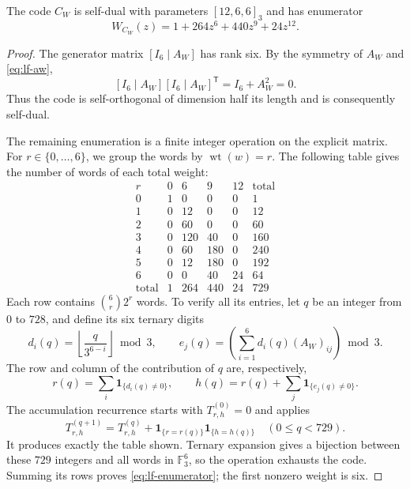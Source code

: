\begin{theorem}
\label{thm:lf-code}
The code \(C_W\) is self-dual with parameters \([12,6,6]_3\) and
has enumerator
\begin{equation}
 W_{C_W}(z)=1+264z^6+440z^9+24z^{12}.
 \label{eq:lf-enumerator}
\end{equation}
\end{theorem}
\begin{proof}
The generator matrix \([I_6\mid A_W]\) has rank six.
By the symmetry of \(A_W\) and \eqref{eq:lf-aw},
\[
 [I_6\mid A_W][I_6\mid A_W]^{\mathsf T}
       =I_6+A_W^2=0.
\]
Thus the code is self-orthogonal of dimension half its
length and is consequently self-dual.

The remaining enumeration is a finite integer operation on
the explicit matrix. For \(r\in\{0,\ldots,6\}\), we group
the words by \(\operatorname{wt}(w)=r\). The following table
gives the number of words of each total weight:
\[
\begin{array}{c|rrrr|r}
r&0&6&9&12&\text{total}\\ \hline
0&1&0&0&0&1\\
1&0&12&0&0&12\\
2&0&60&0&0&60\\
3&0&120&40&0&160\\
4&0&60&180&0&240\\
5&0&12&180&0&192\\
6&0&0&40&24&64\\ \hline
\text{total}&1&264&440&24&729
\end{array}
\]
Each row contains \(\binom6r2^r\) words. To verify
all its entries, let \(q\) be an integer from \(0\) to \(728\), and
define its six ternary digits
\[
 d_i(q)=\left\lfloor\frac{q}{3^{6-i}}\right\rfloor\bmod3,
 \qquad
 e_j(q)=\left(\sum_{i=1}^{6}d_i(q)(A_W)_{ij}\right)\bmod3.
\]
The row and column of the contribution of \(q\) are,
respectively,
\[
 r(q)=\sum_i\mathbf1_{\{d_i(q)\ne0\}},\qquad
 h(q)=r(q)+\sum_j\mathbf1_{\{e_j(q)\ne0\}}.
\]
The accumulation recurrence starts with
\(T^{(0)}_{r,h}=0\) and applies
\[
 T^{(q+1)}_{r,h}
 =T^{(q)}_{r,h}
   +\mathbf1_{\{r=r(q)\}}\mathbf1_{\{h=h(q)\}}
 \quad(0\leq q<729).
\]
It produces exactly the table shown. Ternary expansion
gives a bijection between these \(729\) integers and all words
in \(\mathbb F_3^6\), so the operation exhausts the code.
Summing its rows proves \eqref{eq:lf-enumerator}; the first
nonzero weight is six.
\end{proof}

